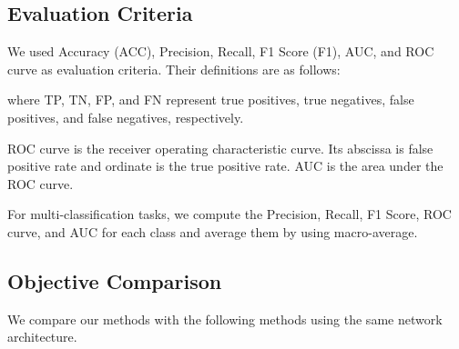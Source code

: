 \subsection{Evaluation Criteria}

We used Accuracy (ACC), {Precision}, Recall, F1 Score (F1), AUC, and {ROC} curve as evaluation criteria. Their definitions are as follows:









where TP, TN, FP, and FN represent true positives, true negatives, false positives, and false negatives, respectively.

{ROC} curve is the receiver operating characteristic curve. Its abscissa is false positive rate and ordinate is the true positive rate. AUC is the area under the {ROC} curve. 

For multi-classification tasks, we compute the {Precision}, Recall, F1 Score, {ROC} curve, and AUC for each class and average them by using macro-average.
\subsection{Objective Comparison}
We compare our methods with the following methods using the same network architecture.


